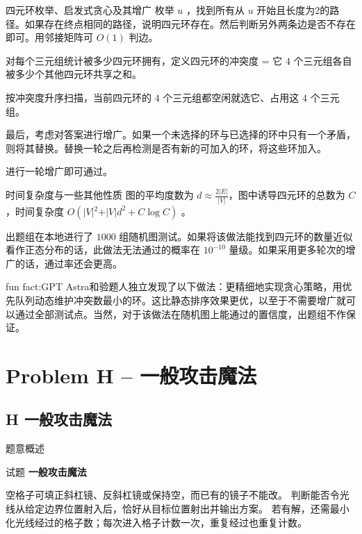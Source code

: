 \documentclass{beamer}
\newcommand{\TT}[1]{{\ttfamily #1}}
\newcommand{\BF}[1]{\textbf{#1}}
\begin{document}
{{\begin{frame}{四元环枚举、启发式贪心及其增广}
  枚举 $u$ ，找到所有从 $u$ 开始且长度为2的路径。如果存在终点相同的路径，说明四元环存在。然后判断另外两条边是否不存在即可。用邻接矩阵可 $O(1)$ 判边。

  对每个三元组统计被多少四元环拥有，定义四元环的冲突度 = 它 $4$ 个三元组各自被多少个其他四元环共享之和。

  按冲突度升序扫描，当前四元环的 $4$ 个三元组都空闲就选它、占用这 $4$ 个三元组。

  最后，考虑对答案进行增广。如果一个未选择的环与已选择的环中只有一个矛盾，则将其替换。替换一轮之后再检测是否有新的可加入的环，将这些环加入。

  进行一轮增广即可通过。
\end{frame}

\begin{frame}{时间复杂度与一些其他性质}
  图的平均度数为 $d \approx \frac{2\vert{}E\vert{}}{\vert{}V\vert{}}$，图中诱导四元环的总数为 $C$ ，时间复杂度 $O(\vert{}V\vert{}^2 + \vert{}V\vert{}d^2 + C \log C)$ 。
  
  出题组在本地进行了 $1000$ 组随机图测试。如果将该做法能找到四元环的数量近似看作正态分布的话，此做法无法通过的概率在 $10^{-10}$ 量级。如果采用更多轮次的增广的话，通过率还会更高。

  fun fact:GPT Astra和验题人独立发现了以下做法：更精细地实现贪心策略，用优先队列动态维护冲突数最小的环。这比静态排序效果更优，以至于不需要增广就可以通过全部测试点。当然，对于该做法在随机图上能通过的置信度，出题组不作保证。
\end{frame}}

{
\section[H]{Problem H -- 一般攻击魔法}
\subsection{H 一般攻击魔法}
\begin{frame}{题意概述}
  \begin{center}试题 \myboxviii{\BF{\TT{H}}} \BF{一般攻击魔法}\end{center}
  空格子可填正斜杠镜、反斜杠镜或保持空，而已有的镜子不能改。
  判断能否令光线从给定边界位置射入后，恰好从目标位置射出并输出方案。
  若有解，还需最小化光线经过的格子数；每次进入格子计数一次，重复经过也重复计数。
\end{frame}


}}
\end{document}
